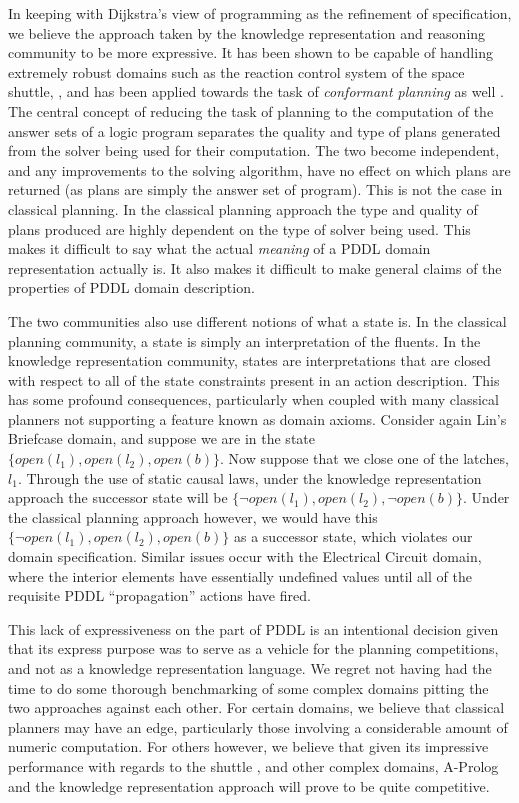 \documentclass{article}
\begin{document}
In keeping with Dijkstra's view of programming as the refinement of specification, we believe the approach taken by the knowledge representation and reasoning community to be more expressive. It has been shown to be capable of handling extremely robust domains such as the reaction control system of the space shuttle, \cite{usa}, and has been applied towards the task of \emph{conformant planning} as well \cite{conformant}. The central concept of reducing the task of planning to the computation of the answer sets of a logic program separates the quality and type of plans generated from the solver being used for their computation. The two become independent, and any improvements to the solving algorithm, have no effect on which plans are returned (as plans are simply the answer set of program). This is not the case in classical planning. In the classical planning approach the type and quality of plans produced are highly dependent on the type of solver being used. This makes it difficult to say what the actual \emph{meaning} of a PDDL domain representation actually is. It also makes it difficult to make general claims of the properties of PDDL domain description.

The two communities also use different notions of what a state is. In the classical planning community, a state is simply an interpretation of the fluents. In the knowledge representation community, states are interpretations that are closed with respect to all of the state constraints present in an action description. This has some profound consequences, particularly when coupled with many classical planners not supporting a feature known as domain axioms. Consider again Lin's Briefcase domain, and suppose we are in the state $\{open(l_{1}),open(l_{2}), open(b)\}$. Now suppose that we close one of the latches, $l_{1}$. Through the use of static causal laws, under the knowledge representation approach the successor state will be $\{\neg{open(l_{1})},open(l_{2}), \neg{open(b)}\}$. Under the classical planning approach however, we would have this $\{\neg{open(l_{1})},open(l_{2}), open(b)\}$ as a successor state, which violates our domain specification. Similar issues occur with the Electrical Circuit domain, where the interior elements have essentially undefined values until all of the requisite PDDL ``propagation'' actions have fired.

This lack of expressiveness on the part of PDDL is an intentional decision given that its express purpose was to serve as a vehicle for the planning competitions, and not as a knowledge representation language. We regret not having had the time to do some thorough benchmarking of some complex domains pitting the two approaches against each other. For certain domains, we believe that classical planners may have an edge, particularly those involving a considerable amount of numeric computation. For others however, we believe that given its impressive performance with regards to the shuttle \cite{usa}, and other complex domains, A-Prolog and the knowledge representation approach will prove to be quite competitive.
\end{document}
